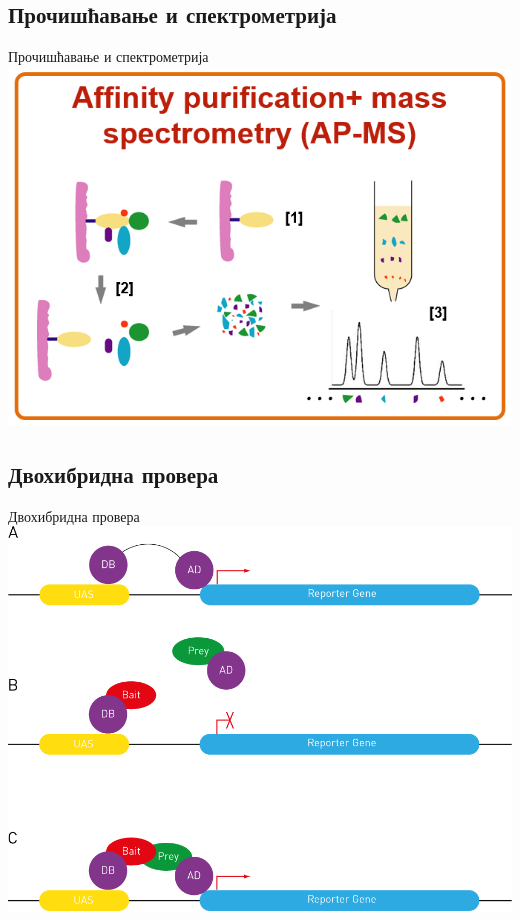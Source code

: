 \documentclass[hyperref={bookmarks=false}]{beamer}
\begin{document}
\subsection{Прочишћавање и спектрометрија}
\begin{frame}{Прочишћавање и спектрометрија}
\centering\includegraphics[width=.85\textwidth]{apms.png}
\end{frame}

\subsection{Двохибридна провера}
\begin{frame}{Двохибридна провера}
\centering\includegraphics[width=.75\textwidth]{y2h.png}
\end{frame}
\end{document}
